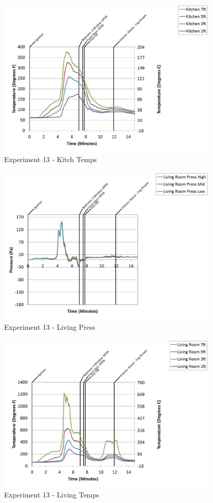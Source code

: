 \documentclass{article}
\begin{document}
\begin{appendices}
	\clearpage

	\begin{figure}[h!]
		\centering
		\includegraphics[height=3.05in]{0_Images/Results_Charts/Exp_13_Charts/KitchTemps.pdf}
		\caption{Experiment 13 - Kitch Temps}
	\end{figure}
 

	\begin{figure}[h!]
		\centering
		\includegraphics[height=3.05in]{0_Images/Results_Charts/Exp_13_Charts/LivingPress.pdf}
		\caption{Experiment 13 - Living Press}
	\end{figure}
 
	\clearpage

	\begin{figure}[h!]
		\centering
		\includegraphics[height=3.05in]{0_Images/Results_Charts/Exp_13_Charts/LivingTemps.pdf}
		\caption{Experiment 13 - Living Temps}
	\end{figure}
 


\end{appendices}
\end{document}
